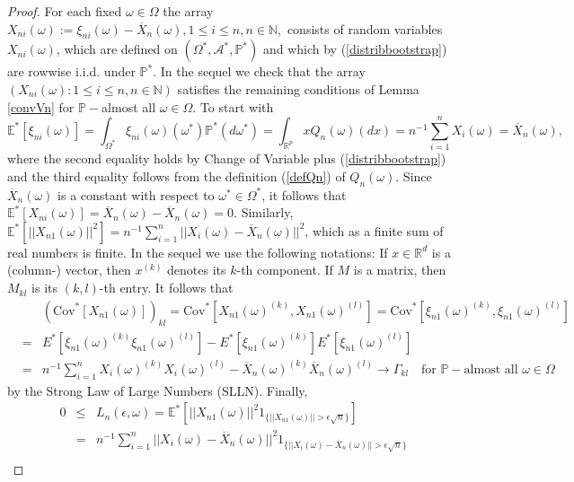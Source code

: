 \documentclass[sn-mathphys,Numbered]{sn-jnl}%
\theoremstyle{thmstyleone}%
\theoremstyle{thmstyletwo}%
\theoremstyle{thmstylethree}%
\begin{document}
\begin{proof} For each fixed $\omega \in \Omega$ the array $X_{ni}(\omega):=\xi_{ni}(\omega)- \overline{X}_n(\omega), 1 \le i \le n, n \in \mathbb{N},$ consists of random variables $X_{ni}(\omega)$, which are defined on $(\Omega^*,\mathcal{A}^*,\mathbb{P}^*)$ and which by (\ref{distribbootstrap}) are rowwise i.i.d. under $\mathbb{P}^*$. In the sequel we check that the array $(X_{ni}(\omega): 1 \le i \le n, n \in \mathbb{N})$ satisfies the remaining conditions of Lemma \ref{convVn} for $\mathbb{P}-$almost all $\omega \in \Omega.$ To start with
$$
   \mathbb{E}^*[\xi_{ni}(\omega)]=\int_{\Omega^*} \xi_{ni}(\omega)(\omega^*) \mathbb{P}^*(d\omega^*)= \int_{\mathbb{R}^p} x  Q_n(\omega)(dx)=n^{-1} \sum_{i=1}^n X_i(\omega) = \overline{X}_n(\omega),
$$
where the second equality holds by Change of Variable plus (\ref{distribbootstrap}) and the third equality follows from the definition (\ref{defQn}) of $Q_n(\omega)$. Since $\overline{X}_n(\omega)$ is a constant with respect to $\omega^* \in \Omega^*$, it follows that
$\mathbb{E}^*[X_{ni}(\omega)]=\overline{X}_n(\omega)-\overline{X}_n(\omega)=0.$ Similarly, $\mathbb{E}^*[||X_{n1}(\omega)||^2]=n^{-1} \sum_{i=1}^n ||X_i(\omega)-\overline{X}_n(\omega)||^2$, which as a finite sum of real numbers is finite. In the sequel we use the following notations:
If $x \in \mathbb{R}^d$ is a (column-) vector, then $x^{(k)}$ denotes its $k$-th component. If $M$ is a matrix, then $M_{kl}$ is its $(k,l)$-th entry. It follows that
\begin{eqnarray*}
& &(\text{Cov}^*[X_{n1}(\omega)])_{kl}= \text{Cov}^*[X_{n1}(\omega)^{(k)},X_{n1}(\omega)^{(l)}]=\text{Cov}^*[\xi_{n1}(\omega)^{(k)},\xi_{n1}(\omega)^{(l)}]\\
&=& E^*[\xi_{n1}(\omega)^{(k)} \xi_{n1}(\omega)^{(l)}]- E^*[\xi_{n1}(\omega)^{(k)}] E^*[\xi_{n1}(\omega)^{(l)}]\\
&=& n^{-1} \sum_{i=1}^n X_i(\omega)^{(k)}X_i(\omega)^{(l)}-\overline{X}_n(\omega)^{(k)}\overline{X}_n(\omega)^{(l)}
\rightarrow \Gamma_{kl} \quad \text{for } \mathbb{P}-\text{almost all } \omega \in \Omega
\end{eqnarray*}
by the Strong Law of Large Numbers (SLLN). Finally,
\begin{eqnarray} \label{Lindeberg}
0 &\le& L_n(\epsilon,\omega)= \mathbb{E}^*[||X_{n1}(\omega)||^2 1_{\{||X_{n1}(\omega)||> \epsilon \sqrt{n}\}}] \nonumber\\
&=& n^{-1}\sum_{i=1}^n ||X_i(\omega)-\overline{X}_n(\omega)||^2 1_{\{||X_i(\omega)-\overline{X}_n(\omega)||> \epsilon \sqrt{n}\}} \label{LB}\\

\end{eqnarray}
\end{proof}
\end{document}
